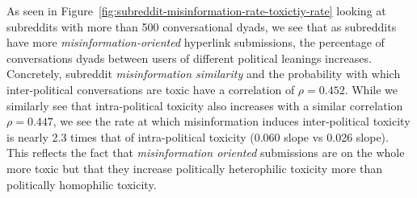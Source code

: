 As seen in Figure~\ref{fig:subreddit-misinformation-rate-toxictiy-rate} looking at subreddits with more than 500 conversational dyads, we see that as subreddits have more \textit{misinformation-oriented} hyperlink submissions, the percentage of conversations dyads between users of different political leanings increases. Concretely, subreddit \textit{misinformation similarity} and the probability with which inter-political conversations are toxic have a correlation of $\rho=0.452$. While we similarly see that intra-political toxicity also increases with a similar correlation $\rho=0.447$, we see the rate at which misinformation induces inter-political toxicity is nearly 2.3 times that of intra-political toxicity (0.060 slope vs 0.026 slope). This reflects the fact that \textit{misinformation oriented} submissions are on the whole more toxic but that they increase politically heterophilic toxicity more than politically homophilic toxicity. 
